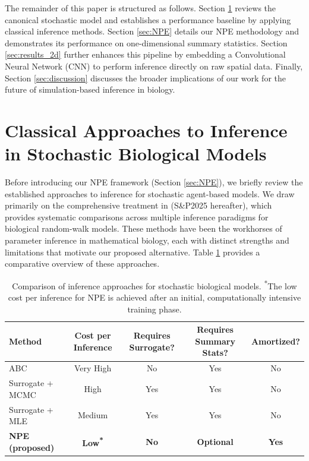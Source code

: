\documentclass{article}
\newcommand{\SP}{S\&P2025 }
\begin{document}
The remainder of this paper is structured as follows. Section \ref{sec:classical_inference} reviews the canonical stochastic model and establishes a performance baseline by applying classical inference methods. Section \ref{sec:NPE} details our NPE methodology and demonstrates its performance on one-dimensional summary statistics. Section \ref{sec:results_2d} further enhances this pipeline by embedding a Convolutional Neural Network (CNN) to perform inference directly on raw spatial data. Finally, Section \ref{sec:discussion} discusses the broader implications of our work for the future of simulation-based inference in biology.


\section{Classical Approaches to Inference in Stochastic Biological Models}\label{sec:classical_inference}
Before introducing our NPE framework (Section \ref{sec:NPE}), we briefly review the established approaches to inference for stochastic agent-based models. We draw primarily on the comprehensive treatment in \cite{Simpson2025.05.25.656057} (\SP hereafter), which provides systematic comparisons across multiple inference paradigms for biological random-walk models. These methods have been the workhorses of parameter inference in mathematical biology, each with distinct strengths and limitations that motivate our proposed alternative. Table \ref{tab:method_comparison} provides a comparative overview of these approaches.

\begin{table}[htbp]
	\centering
	\renewcommand{\arraystretch}{1.3} %
	\begin{tabular}{@{}lcccc@{}}
		\toprule
		\textbf{Method} & \textbf{Cost per Inference} & \textbf{Requires Surrogate?} & \textbf{Requires Summary Stats?} & \textbf{Amortized?} \\
		\midrule
		ABC & Very High & No & Yes & No \\
		Surrogate + MCMC & High & Yes & Yes & No \\
		Surrogate + MLE & Medium & Yes & Yes & No \\
		\textbf{NPE (proposed)} & \textbf{Low\textsuperscript{*}} & \textbf{No} & \textbf{Optional} & \textbf{Yes} \\
		\bottomrule
	\end{tabular}
	\vspace{0.2cm}
	\caption{Comparison of inference approaches for stochastic biological models. \textsuperscript{*}The low cost per inference for NPE is achieved after an initial, computationally intensive training phase.}
	\label{tab:method_comparison}
\end{table}
\end{document}
